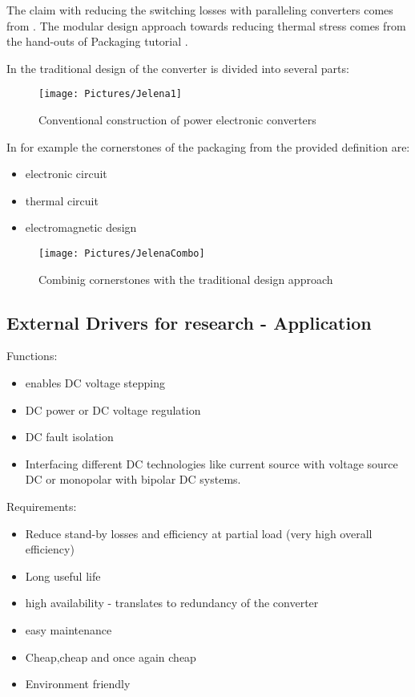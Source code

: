 \documentclass[]{scrartcl}
\begin{document}
The claim with reducing the switching losses with paralleling converters comes from \cite{Kolar2015a}. The modular design approach towards reducing thermal stress comes from the hand-outs of Packaging tutorial \cite{Faculty2014a}.

In \cite{Popovic2005} the traditional design of the converter is divided into several parts:
\begin{figure}[h!]
	\centering
	\texttt{[image: Pictures/Jelena1]}
	\caption{Conventional construction of power electronic converters}
	\label{fig:jelena1}
\end{figure}
\newpage
In for example \cite{Abraham2005} the cornerstones of the packaging from the provided definition are: 
\begin{itemize}
	\item electronic circuit
	\item thermal circuit
	\item electromagnetic design
\end{itemize}
\begin{figure}[h!]
	\centering
	\texttt{[image: Pictures/JelenaCombo]}
	\caption{Combinig cornerstones with the traditional design approach}
	\label{fig:jelenacombo}
\end{figure}
	

\subsection{External Drivers for research - Application}
Functions: 
\begin{itemize}
	\item enables DC voltage stepping
	\item DC power or DC voltage regulation
	\item DC fault isolation
	\item Interfacing different DC technologies like current source with voltage source DC or monopolar with bipolar DC systems.
\end{itemize}

Requirements:
\begin{itemize}
	\item Reduce stand-by losses and efficiency at partial load (very high overall efficiency)
	\item Long useful life
	\item high availability  - translates to redundancy of the converter
	\item easy maintenance
	\item Cheap,cheap and once again cheap
	\item Environment friendly 
\end{itemize}
\end{document}
